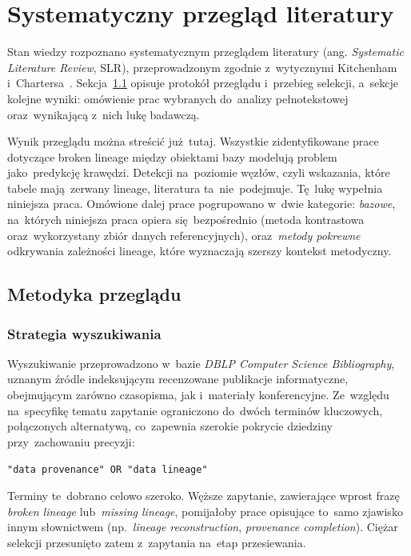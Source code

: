 \documentclass[polish,master,a4paper,oneside]{ppfcmthesis}
\renewcommand{\_}{\origtextunderscore\ifmmode\else\allowbreak\fi}
\begin{document}
\section{Systematyczny przegląd literatury}
\label{sec:literatura}

Stan wiedzy rozpoznano systematycznym przeglądem literatury (ang.
\emph{Systematic Literature Review}, SLR), przeprowadzonym zgodnie
z~wytycznymi Kitchenham i~Chartersa~\cite{Kitchenham2007}. Sekcja~\ref{sec:slr-metodyka}
opisuje protokół przeglądu i~przebieg selekcji, a~sekcje kolejne wyniki:
omówienie prac wybranych do~analizy pełnotekstowej oraz~wynikającą z~nich
lukę badawczą.

Wynik przeglądu można streścić już~tutaj. Wszystkie zidentyfikowane prace
dotyczące broken lineage między obiektami bazy modelują problem
jako~predykcję krawędzi. Detekcji na~poziomie węzłów, czyli wskazania,
które tabele mają~zerwany lineage, literatura ta~nie~podejmuje. Tę~lukę
wypełnia niniejsza praca. Omówione dalej prace pogrupowano w~dwie kategorie:
\emph{bazowe}, na~których niniejsza praca opiera się~bezpośrednio (metoda
kontrastowa oraz~wykorzystany zbiór danych referencyjnych), oraz~\emph{metody
pokrewne} odkrywania zależności lineage, które wyznaczają szerszy kontekst
metodyczny.

\subsection{Metodyka przeglądu}
\label{sec:slr-metodyka}

\subsubsection{Strategia wyszukiwania}

Wyszukiwanie przeprowadzono w~bazie \emph{DBLP Computer Science
Bibliography}, uznanym źródle indeksującym recenzowane publikacje
informatyczne, obejmującym zarówno czasopisma, jak i~materiały konferencyjne.
Ze~względu na~specyfikę tematu zapytanie ograniczono do~dwóch terminów
kluczowych, połączonych alternatywą, co~zapewnia szerokie pokrycie dziedziny
przy~zachowaniu precyzji:

\begin{center}
\texttt{"data provenance" OR "data lineage"}
\end{center}

Terminy te~dobrano celowo szeroko. Węższe zapytanie, zawierające wprost
frazę \emph{broken lineage} lub~\emph{missing lineage}, pomijałoby prace
opisujące to~samo zjawisko innym słownictwem (np.~\emph{lineage
reconstruction}, \emph{provenance completion}). Ciężar selekcji przesunięto
zatem z~zapytania na~etap przesiewania.
\end{document}
